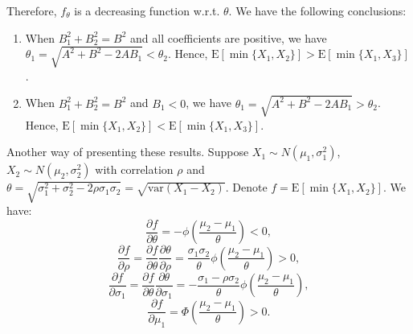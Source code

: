 \documentclass[opre,sglanonrev]{informs4}
\begin{document}
Therefore, $f_\theta$ is a decreasing function w.r.t. $\theta$. We have the following conclusions:
\begin{enumerate}
	\item When $B_1^2+B_2^2=B^2$ and all coefficients are positive, we have $\theta_1=\sqrt{A^2+B^2-2AB_1}<\theta_2$. Hence, $\text{E}[\min\{X_1, X_2\}]>\text{E}[\min\{X_1, X_3\}]$.
	\item When $B_1^2+B_2^2=B^2$ and $B_1<0$, we have $\theta_1=\sqrt{A^2+B^2-2AB_1}>\theta_2$. Hence, $\text{E}[\min\{X_1, X_2\}]<\text{E}[\min\{X_1, X_3\}]$.
\end{enumerate}

Another way of presenting these results. Suppose $X_1\sim N(\mu_1,\sigma^2_1)$, $X_2\sim N(\mu_2,\sigma^2_2)$ with correlation $\rho$ and $\theta = \sqrt{\sigma^2_1+\sigma^2_2-2\rho \sigma_1\sigma_2} = \sqrt{\text{var}(X_1-X_2)}$. Denote $f=\text{E}[\min\{X_1, X_2\}] $. We have:
\begin{equation}
	\frac{\partial f}{\partial \theta} = -\phi(\frac{\mu_2-\mu_1}{\theta})<0,
\end{equation}
\begin{equation}
\label{rho}
	\frac{\partial f}{\partial \rho} = \frac{\partial f}{\partial \theta} \frac{\partial \theta}{\partial \rho} =  \frac{\sigma_1\sigma_2}{\theta}\phi(\frac{\mu_2-\mu_1}{\theta})>0,
\end{equation}
\begin{equation}
\label{sigma}
	\frac{\partial f}{\partial \sigma_1} = \frac{\partial f}{\partial \theta} \frac{\partial \theta}{\partial \sigma_1} = -\frac{\sigma_1-\rho\sigma_2}{\theta} \phi(\frac{\mu_2-\mu_1}{\theta}),
\end{equation}
\begin{equation}
\label{mu}
	\frac{\partial f}{\partial \mu_1} = \Phi( \frac{\mu_2-\mu_1}{\theta})>0.
\end{equation}
\end{document}
